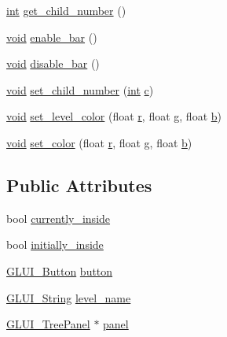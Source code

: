 \begin{DoxyCompactItemize}
\hyperlink{wglext_8h_a500a82aecba06f4550f6849b8099ca21}{int} \hyperlink{class_g_l_u_i___tree_a09d07235daca64350c7d253bb937732b}{get\+\_\+child\+\_\+number} ()
\item 
\hyperlink{wglext_8h_a9e6b7f1933461ef318bb000d6bd13b83}{void} \hyperlink{class_g_l_u_i___tree_a5d669dacda1b1edb9ada2fbce957e4ca}{enable\+\_\+bar} ()
\item 
\hyperlink{wglext_8h_a9e6b7f1933461ef318bb000d6bd13b83}{void} \hyperlink{class_g_l_u_i___tree_a7f39a382e4c3adc1634267de80276c7f}{disable\+\_\+bar} ()
\item 
\hyperlink{wglext_8h_a9e6b7f1933461ef318bb000d6bd13b83}{void} \hyperlink{class_g_l_u_i___tree_a7b854371a9ab38f30bb83acc9d762b84}{set\+\_\+child\+\_\+number} (\hyperlink{wglext_8h_a500a82aecba06f4550f6849b8099ca21}{int} \hyperlink{glext_8h_a1f2d7f8147412c43ba2303a56f97ee73}{c})
\item 
\hyperlink{wglext_8h_a9e6b7f1933461ef318bb000d6bd13b83}{void} \hyperlink{class_g_l_u_i___tree_a1b8694b525dcc72d11945c5d41565e2b}{set\+\_\+level\+\_\+color} (float \hyperlink{glext_8h_a42ce7cdc612e53abee15043f80220d97}{r}, float \hyperlink{glext_8h_acaceb3a655ff28b75259860bcb868f9f}{g}, float \hyperlink{glext_8h_a0f71581a41fd2264c8944126dabbd010}{b})
\item 
\hyperlink{wglext_8h_a9e6b7f1933461ef318bb000d6bd13b83}{void} \hyperlink{class_g_l_u_i___tree_a421127bfedefee3c5fb9c17202ca4bc7}{set\+\_\+color} (float \hyperlink{glext_8h_a42ce7cdc612e53abee15043f80220d97}{r}, float \hyperlink{glext_8h_acaceb3a655ff28b75259860bcb868f9f}{g}, float \hyperlink{glext_8h_a0f71581a41fd2264c8944126dabbd010}{b})
\end{DoxyCompactItemize}
\subsection*{Public Attributes}
\begin{DoxyCompactItemize}
\item 
bool \hyperlink{class_g_l_u_i___tree_ab8c9cfc5885edf05eb1d516e61ebd7dc}{currently\+\_\+inside}
\item 
bool \hyperlink{class_g_l_u_i___tree_a920c5916bd08173bd22043e1f31b85d5}{initially\+\_\+inside}
\item 
\hyperlink{class_g_l_u_i___button}{G\+L\+U\+I\+\_\+\+Button} \hyperlink{class_g_l_u_i___tree_ab57f8d77aea6238adb73bc2572b030b8}{button}
\item 
\hyperlink{glui_8h_aada824856f7bcf29794719981ebd8f60}{G\+L\+U\+I\+\_\+\+String} \hyperlink{class_g_l_u_i___tree_a4047a0265f95953a1a029ec0f3dda5c3}{level\+\_\+name}
\item 
\hyperlink{class_g_l_u_i___tree_panel}{G\+L\+U\+I\+\_\+\+Tree\+Panel} $\ast$ \hyperlink{class_g_l_u_i___tree_a4ba552062c7dfae187a9d346f8b42f08}{panel}
\end{DoxyCompactItemize}
